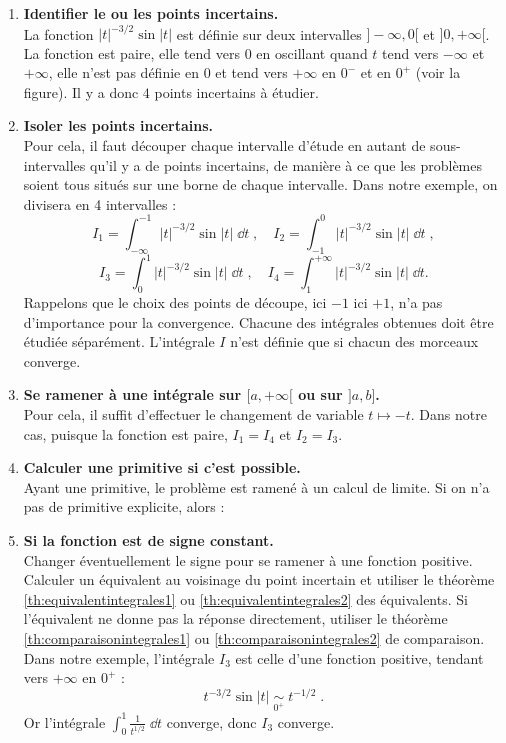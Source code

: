 \documentclass[class=report,crop=false]{standalone}
\begin{document}
\begin{enumerate}
\item \textbf{Identifier le ou les points incertains.}\\
La fonction $|t|^{-3/2}\sin |t|$ est définie sur deux intervalles $]-\infty,0[$ et $]0,+\infty[$.
La fonction est paire, elle tend vers $0$ en
oscillant quand $t$ tend vers $-\infty$ et $+\infty$, elle n'est pas définie en $0$ et
tend vers $+\infty$ en $0^-$ et en $0^+$ (voir la figure). 
Il y a donc $4$ points incertains à étudier.
  
\item \textbf{Isoler les points incertains.}\\
Pour cela, il faut découper chaque intervalle d'étude en autant de
sous-intervalles qu'il y a de points incertains, de manière à ce
que les problèmes soient tous situés sur une borne de chaque
intervalle. Dans notre exemple, on divisera en 4 intervalles :
$$
I_1 = \int_{-\infty}^{-1} |t|^{-3/2} \sin |t| \;\dd t\;,\quad
I_2 = \int_{-1}^{0} |t|^{-3/2} \sin |t| \;\dd t\;,
$$
$$
I_3 = \int_{0}^{1} |t|^{-3/2} \sin |t| \;\dd t\;,\quad
I_4 = \int_{1}^{+\infty} |t|^{-3/2} \sin |t| \;\dd t.
$$
Rappelons que le choix des points de découpe, ici $-1$ ici $+1$, n'a pas d'importance
pour la convergence. Chacune des intégrales obtenues doit être étudiée
séparément. L'intégrale $I$ n'est définie que si chacun des
morceaux converge.

\item \textbf{Se ramener à une intégrale sur $[a,+\infty[$ ou sur $]a,b]$.}\\
Pour cela, il suffit d'effectuer le changement de variable 
$t\mapsto -t$. Dans notre cas, puisque la fonction est paire,
$I_1=I_4$ et $I_2=I_3$.

\item \textbf{Calculer une primitive si c'est possible.}\\
Ayant une primitive, le problème est ramené à un calcul de
limite. Si on n'a pas de primitive explicite, alors :

\item \textbf{Si la fonction est de signe constant.}\\
Changer éventuellement le signe pour se ramener à une fonction positive.
Calculer un équivalent au voisinage du point incertain et utiliser
le théorème \ref{th:equivalentintegrales1} ou 
\ref{th:equivalentintegrales2} des équivalents. Si l'équivalent ne donne pas la
réponse directement, utiliser le théorème \ref{th:comparaisonintegrales1}
ou \ref{th:comparaisonintegrales2} de comparaison.
Dans notre exemple, l'intégrale $I_3$ est celle d'une fonction
positive, tendant vers $+\infty$ en $0^+$ :
$$
t^{-3/2} \sin |t|  \;\underset{0^+}{\sim}\; t^{-1/2}\;.
$$
Or l'intégrale $\int_0^1 \frac{1}{t^{1/2}}\;\dd t$ converge, donc $I_3$
converge.


\end{enumerate}
\end{document}
